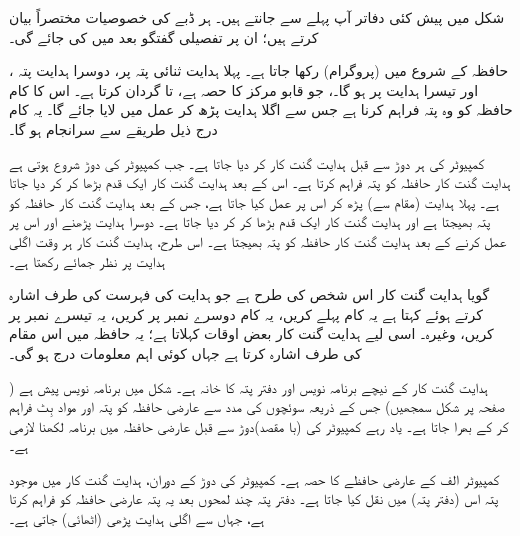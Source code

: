 شکل  میں پیش کئی دفاتر  آپ پہلے سے  جانتے ہیں۔  ہر ڈبے کی   خصوصیات مختصراً  بیان کرتے ہیں؛ ان پر تفصیلی گفتگو بعد میں کی جائے گی۔

حافظہ  کے شروع میں (پروگرام)  رکھا جاتا ہے۔ پہلا ہدایت ثنائی پتہ  پر، دوسرا ہدایت پتہ ، اور تیسرا ہدایت  پر ہو گا۔،  جو قابو مرکز کا حصہ ہے،  تا  گردان کرتا ہے۔ اس کا کام حافظہ کو وہ پتہ فراہم کرنا ہے جس سے اگلا ہدایت پڑھ کر عمل میں لایا جائے گا۔ یہ کام درج ذیل طریقے سے سرانجام ہو گا۔

کمپیوٹر کی ہر دوڑ  سے قبل ہدایت گنت کار     کر دیا جاتا ہے۔ جب کمپیوٹر کی دوڑ شروع  ہوتی ہے ہدایت گنت کار   حافظہ کو پتہ  فراہم کرتا ہے۔ اس کے بعد ہدایت گنت کار   ایک قدم بڑھا کر   کر دیا جاتا ہے۔ پہلا ہدایت (مقام  سے) پڑھ کر اس پر عمل کیا جاتا ہے، جس کے بعد ہدایت گنت کار حافظہ کو پتہ  بھیجتا ہے اور   ہدایت گنت کار ایک قدم بڑھا کر  کر دیا جاتا ہے۔ دوسرا ہدایت پڑھنے اور اس پر عمل کرنے کے بعد ہدایت گنت کار حافظہ کو  پتہ بھیجتا ہے۔ اس طرح، ہدایت گنت کار ہر وقت اگلی  ہدایت  پر نظر جمائے رکھتا ہے۔

گویا ہدایت گنت کار اس شخص کی طرح ہے جو ہدایت کی فہرست  کی طرف اشارہ کرتے ہوئے کہتا ہے یہ کام  پہلے کریں، یہ کام دوسرے نمبر پر کریں، یہ تیسرے نمبر پر کریں، وغیرہ۔ اسی لیے ہدایت گنت کار بعض اوقات  کہلاتا ہے؛ یہ حافظہ میں اس مقام کی طرف اشارہ کرتا ہے جہاں کوئی   اہم معلومات درج ہو گی۔

ہدایت گنت کار کے نیچے برنامہ نویس   اور دفتر پتہ کا  خانہ  ہے۔ شکل  میں برنامہ نویس پیش ہے (     صفحہ  پر شکل  سمجھیں)   جس  کے ذریعہ سوئچوں  کی مدد سے   عارضی حافظہ کو   پتہ اور  مواد   بِٹ فراہم کر  کے بھرا جاتا ہے۔ یاد رہے کمپیوٹر کی  (با مقصد)دوڑ سے قبل عارضی حافظہ میں برنامہ  لکھنا لازمی ہے۔

   کمپیوٹر  الف کے عارضی حافظے کا حصہ ہے۔ کمپیوٹر  کی دوڑ کے دوران، ہدایت گنت کار  میں موجود پتہ  اس   (دفتر پتہ)     میں  نقل  کیا جاتا ہے۔  دفتر پتہ   چند لمحوں بعد یہ پتہ عارضی  حافظہ کو فراہم کرتا ہے، جہاں سے   اگلی ہدایت پڑھی (اٹھائی)  جاتی ہے۔

